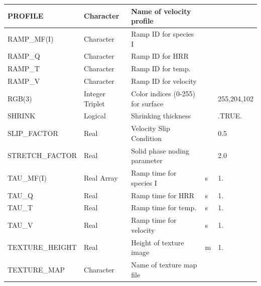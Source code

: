 \documentclass[11pt]{book}
\begin{document}
\begin{longtable}{|l|l|l|l|l|}
{\ct PROFILE}                         & Character       & Name of velocity profile          &                     &                         \\ \hline
{\ct RAMP\_MF(I)}                     & Character       & Ramp ID for species I             &                     &                         \\ \hline
{\ct RAMP\_Q}                         & Character       & Ramp ID for HRR                   &                     &                         \\ \hline
{\ct RAMP\_T}                         & Character       & Ramp ID for temp.                 &                     &                         \\ \hline
{\ct RAMP\_V}                         & Character       & Ramp ID for velocity              &                     &                         \\ \hline
{\ct RGB(3)}                          & Integer Triplet & Color indices (0-255) for surface &                     & \small 255,204,102      \\ \hline
{\ct SHRINK}                          & Logical         & Shrinking thickness               &                     & {\ct .TRUE.}            \\ \hline
{\ct SLIP\_FACTOR    }                & Real            & Velocity Slip Condition           &                     & 0.5                     \\ \hline
{\ct STRETCH\_FACTOR    }             & Real            & Solid phase noding parameter      &                     & 2.0                     \\ \hline
{\ct TAU\_MF(I)}                      & Real Array      & Ramp time for species {\ct I}     & s                   & 1.     \\ \hline
{\ct TAU\_Q}                          & Real            & Ramp time for HRR                 & s                   & 1.     \\ \hline
{\ct TAU\_T}                          & Real            & Ramp time for temp.               & s                   & 1.     \\ \hline
{\ct TAU\_V}                          & Real            & Ramp time for velocity            & s                   & 1.     \\ \hline
{\ct TEXTURE\_HEIGHT}                 & Real            & Height of texture image           & m                   & 1.     \\ \hline
{\ct TEXTURE\_MAP}                    & Character       & Name of texture map file          &                     &        \\ \hline

\end{longtable}
\end{document}
